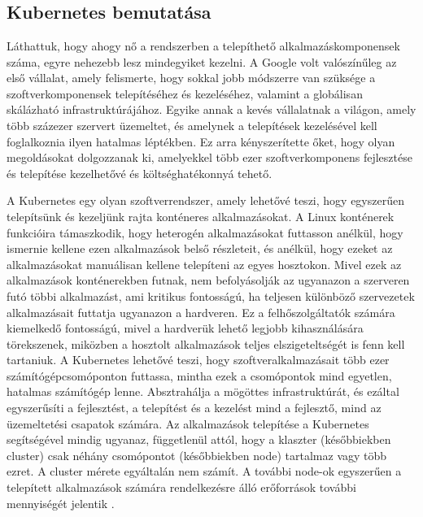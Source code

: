 \chapter{\kubernetes}
\section{Kubernetes bemutatása}
Láthattuk, hogy ahogy nő a rendszerben a telepíthető alkalmazáskomponensek száma, egyre nehezebb lesz mindegyiket kezelni.
A Google volt valószínűleg az első vállalat, amely felismerte, hogy sokkal jobb módszerre van szüksége a szoftverkomponensek telepítéséhez és kezeléséhez, valamint a globálisan skálázható infrastruktúrájához.
Egyike annak a kevés vállalatnak a világon, amely több százezer szervert üzemeltet, és amelynek a telepítések kezelésével kell foglalkoznia ilyen hatalmas léptékben.
Ez arra kényszerítette őket, hogy olyan megoldásokat dolgozzanak ki, amelyekkel több ezer szoftverkomponens fejlesztése és telepítése kezelhetővé és költséghatékonnyá tehető.

A Kubernetes egy olyan szoftverrendszer, amely lehetővé teszi, hogy egyszerűen telepítsünk és kezeljünk rajta konténeres alkalmazásokat.
A Linux konténerek funkcióira támaszkodik, hogy heterogén alkalmazásokat futtasson anélkül, hogy ismernie kellene ezen alkalmazások belső részleteit, és anélkül, hogy ezeket az alkalmazásokat manuálisan kellene telepíteni az egyes hosztokon.
Mivel ezek az alkalmazások konténerekben futnak, nem befolyásolják az ugyanazon a szerveren futó többi alkalmazást, ami kritikus fontosságú, ha teljesen különböző szervezetek alkalmazásait futtatja ugyanazon a hardveren.
Ez a felhőszolgáltatók számára kiemelkedő fontosságú, mivel a hardverük lehető legjobb kihasználására törekszenek, miközben a hosztolt alkalmazások teljes elszigeteltségét is fenn kell tartaniuk.
A Kubernetes lehetővé teszi, hogy szoftveralkalmazásait több ezer számítógépcsomóponton futtassa, mintha ezek a csomópontok mind egyetlen, hatalmas számítógép lenne.
Absztrahálja a mögöttes infrastruktúrát, és ezáltal egyszerűsíti a fejlesztést, a telepítést és a kezelést mind a fejlesztő, mind az üzemeltetési csapatok számára.
Az alkalmazások telepítése a Kubernetes segítségével mindig ugyanaz, függetlenül attól, hogy a klaszter (későbbiekben cluster) csak néhány csomópontot (későbbiekben node) tartalmaz vagy több ezret.
A cluster mérete egyáltalán nem számít.
A további node-ok egyszerűen a telepített alkalmazások számára rendelkezésre álló erőforrások további mennyiségét jelentik \cite{Marko17}.

